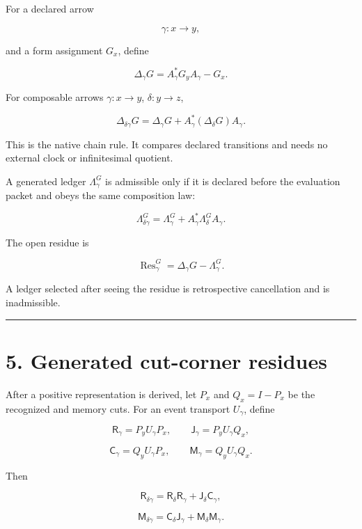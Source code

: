 For a declared arrow

\[
\gamma:x\longrightarrow y,
\]

and a form assignment \(G_x\), define

\[
\boxed{
\Delta_\gamma G
=A_\gamma^*G_yA_\gamma-G_x.
}
\]

For composable arrows \(\gamma:x\to y\), \(\delta:y\to z\),

\[
\boxed{
\Delta_{\delta\gamma}G
=
\Delta_\gamma G
+A_\gamma^*(\Delta_\delta G)A_\gamma.
}
\]

This is the native chain rule. It compares declared transitions and needs no
external clock or infinitesimal quotient.

A generated ledger \(\Lambda_\gamma^G\) is admissible only if it is declared
before the evaluation packet and obeys the same composition law:

\[
\Lambda_{\delta\gamma}^G
=
\Lambda_\gamma^G
+A_\gamma^*\Lambda_\delta^GA_\gamma.
\]

The open residue is

\[
\operatorname{Res}_\gamma^G
=
\Delta_\gamma G-\Lambda_\gamma^G.
\]

A ledger selected after seeing the residue is retrospective cancellation and
is inadmissible.

\begin{center}\rule{0.5\linewidth}{0.5pt}\end{center}

\hypertarget{generated-cut-corner-residues}{%
\section{5. Generated cut-corner residues}\label{generated-cut-corner-residues}}

After a positive representation is derived, let \(P_x\) and \(Q_x=I-P_x\)
be the recognized and memory cuts. For an event transport \(U_\gamma\), define

\[
\mathsf R_\gamma=P_yU_\gamma P_x,
\qquad
\mathsf J_\gamma=P_yU_\gamma Q_x,
\]

\[
\mathsf C_\gamma=Q_yU_\gamma P_x,
\qquad
\mathsf M_\gamma=Q_yU_\gamma Q_x.
\]

Then

\[
\mathsf R_{\delta\gamma}
=
\mathsf R_\delta\mathsf R_\gamma
+
\mathsf J_\delta\mathsf C_\gamma,
\]

\[
\mathsf M_{\delta\gamma}
=
\mathsf C_\delta\mathsf J_\gamma
+
\mathsf M_\delta\mathsf M_\gamma.
\]

